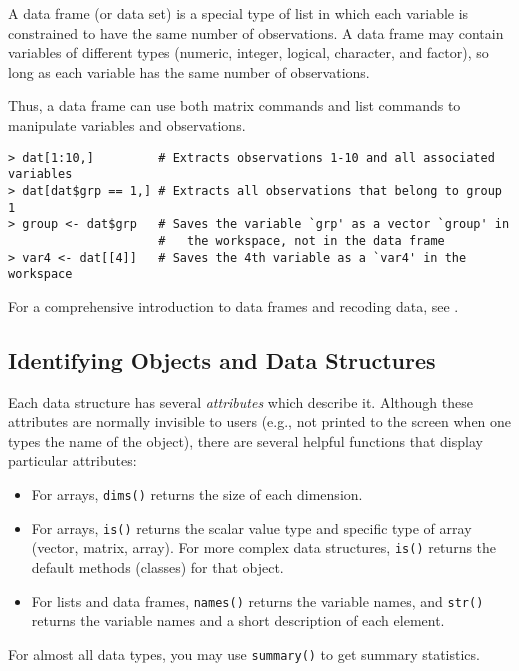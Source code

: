 A data frame (or data set) is a special type of list in which each
variable is constrained to have the same number of observations.  A
data frame may contain variables of different types (numeric,
integer, logical, character, and factor), so long as each variable has
the same number of observations. 

Thus, a data frame can use both matrix commands and list commands to
manipulate variables and observations.  
\begin{verbatim}
> dat[1:10,]         # Extracts observations 1-10 and all associated variables  
> dat[dat$grp == 1,] # Extracts all observations that belong to group 1 
> group <- dat$grp   # Saves the variable `grp' as a vector `group' in
                     #   the workspace, not in the data frame
> var4 <- dat[[4]]   # Saves the 4th variable as a `var4' in the workspace
\end{verbatim}

For a comprehensive introduction to data frames and recoding data, see
.

\subsection{Identifying Objects and Data Structures}

Each data structure has several \emph{attributes} which describe it.
Although these attributes are normally invisible to users (e.g., not
printed to the screen when one types the name of the object), there are
several helpful functions that display particular attributes:  
\begin{itemize}
\item For arrays, {\tt dims()} returns the size of each dimension.  
\item For arrays, {\tt is()} returns the scalar value type and
specific type of array (vector, matrix, array).  For more complex data
structures, {\tt is()} returns the default methods (classes) for that object. 
\item For lists and data frames, {\tt names()} returns the variable
names, and {\tt str()} returns the variable names and a short
description of each element.  
\end{itemize}  
For almost all data types, you may use {\tt summary()} to get summary
statistics.  



